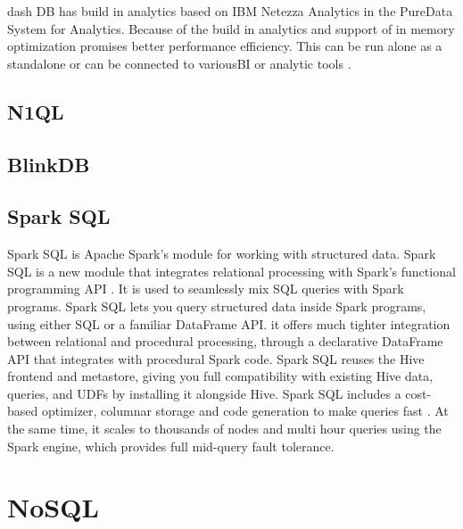 {     dash DB has build in analytics based on IBM Netezza Analytics
     in the PureData System for Analytics. Because of the build in
     analytics and support of
     in memory optimization promises better performance efficiency.
     This can be run alone as a standalone or can be connected to
     variousBI or analytic tools \cite{www-ibm-analytics.com}.

     \pv
       
\subsection{N1QL}

\pv

\subsection{BlinkDB}

\pv

\subsection{Spark SQL}

     Spark SQL is Apache Spark's module for working with structured
     data. Spark SQL is a new module that integrates relational
     processing with Spark's functional programming API
     \cite{www-spark-sql}. It is used to seamlessly mix SQL queries
     with Spark programs. Spark SQL lets you query structured data
     inside Spark programs, using either SQL or a familiar DataFrame
     API.  it offers much tighter integration between relational and
     procedural processing, through a declarative DataFrame API that
     integrates with procedural Spark code.  Spark SQL reuses the Hive
     frontend and metastore, giving you full compatibility with
     existing Hive data, queries, and UDFs by installing it alongside
     Hive. Spark SQL includes a cost-based optimizer, columnar storage
     and code generation to make queries fast
     \cite{www-spark-sql-2}. At the same time, it scales to thousands
     of nodes and multi hour queries using the Spark engine, which
     provides full mid-query fault tolerance.

\section{NoSQL}
\label{S:o-NoSQL}

}
